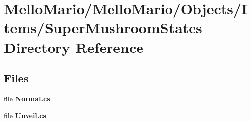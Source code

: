 \section{Mello\+Mario/\+Mello\+Mario/\+Objects/\+Items/\+Super\+Mushroom\+States Directory Reference}
\label{dir_cbe675e846ad387c0bef06d0a37ff751}
\subsection*{Files}
\begin{DoxyCompactItemize}
\item 
file \textbf{ Normal.\+cs}
\item 
file \textbf{ Unveil.\+cs}
\end{DoxyCompactItemize}
